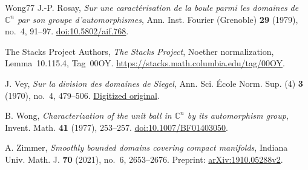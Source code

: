 \begin{thebibliography}{Wong77}
J.-P. Rosay,
\emph{Sur une caract\'erisation de la boule parmi les domaines de
$\mathbb C^n$ par son groupe d'automorphismes},
Ann. Inst. Fourier (Grenoble) \textbf{29} (1979), no.~4, 91--97.
\href{https://doi.org/10.5802/aif.768}{doi:10.5802/aif.768}.

The Stacks Project Authors,
\emph{The Stacks Project}, Noether normalization,
Lemma~10.115.4, Tag~00OY.
\url{https://stacks.math.columbia.edu/tag/00OY}.

J. Vey,
\emph{Sur la division des domaines de Siegel},
Ann. Sci. \'Ecole Norm. Sup. (4) \textbf{3} (1970), no.~4, 479--506.
\href{https://www.numdam.org/article/ASENS_1970_4_3_4_479_0.pdf}
{Digitized original}.

B. Wong,
\emph{Characterization of the unit ball in $\mathbb C^n$ by its
automorphism group},
Invent. Math. \textbf{41} (1977), 253--257.
\href{https://doi.org/10.1007/BF01403050}{doi:10.1007/BF01403050}.

A. Zimmer,
\emph{Smoothly bounded domains covering compact manifolds},
Indiana Univ. Math. J. \textbf{70} (2021), no.~6, 2653--2676.
Preprint: \href{https://arxiv.org/abs/1910.05288v2}{arXiv:1910.05288v2}.

\end{thebibliography}
